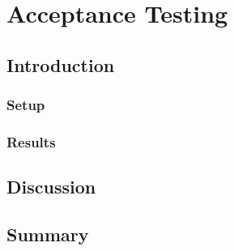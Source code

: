 \chapter{Acceptance Testing}\label{ch:acceptance-testing}

\section{Introduction}\label{sec:acc-introduction}

\subsection{Setup}\label{sec:acc-setup}

\subsection{Results}\label{sec:acc-results}

\section{Discussion}\label{sec:acc-discussion}

\section{Summary}\label{sec:acc-summary}
